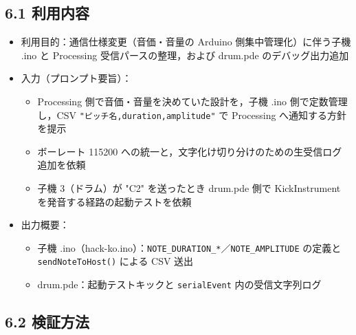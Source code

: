\documentclass[a4paper,11pt]{ltjsarticle}
\providecommand{\％}{\%}
\begin{document}
\subsection*{6.1 利用内容}

\begin{itemize}
    \item 利用目的：通信仕様変更（音価・音量の Arduino 側集中管理化）に伴う子機 .ino と Processing 受信パースの整理，および drum.pde のデバッグ出力追加
    \item 入力（プロンプト要旨）：
    \begin{itemize}
        \item Processing 側で音価・音量を決めていた設計を，子機 .ino 側で定数管理し，CSV \texttt{"ピッチ名,duration,amplitude"} で Processing へ通知する方針を提示
        \item ボーレート 115200 への統一と，文字化け切り分けのための生受信ログ追加を依頼
        \item 子機 3（ドラム）が "C2" を送ったとき drum.pde 側で KickInstrument を発音する経路の起動テストを依頼
    \end{itemize}
    \item 出力概要：
    \begin{itemize}
        \item 子機 .ino（hack-ko.ino）：\texttt{NOTE\_DURATION\_*}／\texttt{NOTE\_AMPLITUDE} の定義と \texttt{sendNoteToHost()} による CSV 送出
        \item drum.pde：起動テストキックと \texttt{serialEvent} 内の受信文字列ログ
    \end{itemize}
\end{itemize}

\subsection*{6.2 検証方法}
\end{document}
